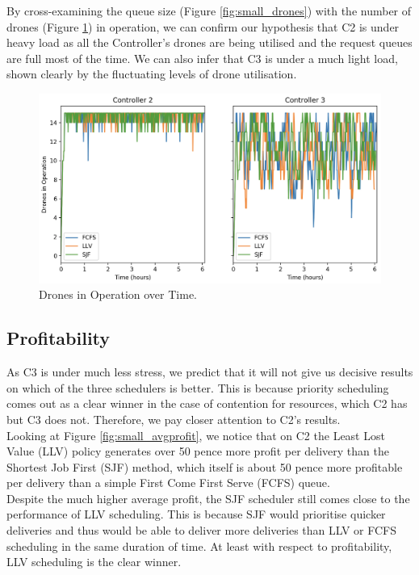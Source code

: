 \documentclass[a4paper,11pt,titlepage]{report}
\begin{document}
By cross-examining the queue size (Figure \ref{fig:small_drones}) with the number of drones (Figure \ref{fig:small_opdrones}) in operation, we can confirm our hypothesis that C2 is under heavy load as all the Controller's drones are being utilised and the request queues are full most of the time. We can also infer that C3 is under a much light load, shown clearly by the fluctuating levels of drone utilisation.

\clearpage
\begin{figure}[!hbpt]
  \center
  \includegraphics[width=\linewidth]{img/small/opdrones.png}
  \caption{Drones in Operation over Time.}
  \label{fig:small_opdrones}
\end{figure}

\subsection{Profitability}
As C3 is under much less stress, we predict that it will not give us decisive results on which of the three schedulers is better. This is because priority scheduling comes out as a clear winner in the case of contention for resources, which C2 has but C3 does not. Therefore, we pay closer attention to C2's results.\\

Looking at Figure \ref{fig:small_avgprofit}, we notice that on C2 the Least Lost Value (LLV) policy generates over 50 pence more profit per delivery than the Shortest Job First (SJF) method, which itself is about 50 pence more profitable per delivery than a simple First Come First Serve (FCFS) queue.\\

Despite the much higher average profit, the SJF scheduler still comes close to the performance of LLV scheduling. This is because SJF would prioritise quicker deliveries and thus would be able to deliver more deliveries than LLV or FCFS scheduling in the same duration of time. At least with respect to profitability, LLV scheduling is the clear winner.
\end{document}
